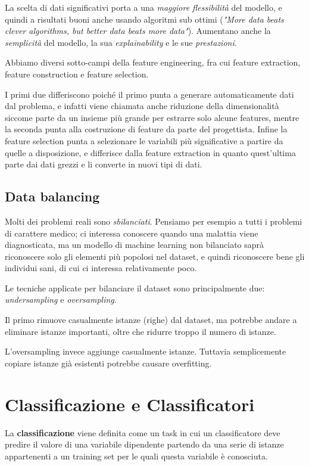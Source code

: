         La scelta di dati significativi porta a una \textit{maggiore flessibilità} del modello, e quindi a risultati buoni anche usando algoritmi sub ottimi (\textit{"More data beats clever algorithms, but better data beats more data"}). Aumentano anche la \textit{semplicità} del modello, la sua \textit{explainability} e le sue \textit{prestazioni}.
        
        Abbiamo diversi sotto-campi della feature engineering, fra cui feature extraction, feature construction e feature selection.
        
        I primi due differiscono poiché il primo punta a generare automaticamente dati dal problema, e infatti viene chiamata anche riduzione della dimensionalità siccome parte da un insieme più grande per estrarre solo alcune features, mentre la seconda punta alla costruzione di feature da parte del progettista. Infine la feature selection punta a selezionare le variabili più significative a partire da quelle a disposizione, e differisce dalla feature extraction in quanto quest'ultima parte dai dati grezzi e li converte in nuovi tipi di dati.
        
    \subsection{Data balancing}
        Molti dei problemi reali sono \textit{sbilanciati}. Pensiamo per esempio a tutti i problemi di carattere medico; ci interessa conoscere quando una malattia viene diagnosticata, ma un modello di machine learning non bilanciato saprà riconoscere solo gli elementi più popolosi nel dataset, e quindi riconoscere bene gli individui sani, di cui ci interessa relativamente poco.
        
        Le tecniche applicate per bilanciare il dataset sono principalmente due: \textit{undersampling} e \textit{oversampling}.
        
        Il primo rimuove casualmente istanze (righe) dal dataset, ma potrebbe andare a eliminare istanze importanti, oltre che ridurre troppo il numero di istanze.
        
        L'oversampling invece aggiunge casualmente istanze. Tuttavia semplicemente copiare istanze già esistenti potrebbe causare overfitting.
        
\section{Classificazione e Classificatori}
    La \textbf{classificazione} viene definita come un task in cui un classificatore deve predire il valore di una variabile dipendente partendo da una serie di istanze appartenenti a un training set per le quali questa variabile è conosciuta.
    
